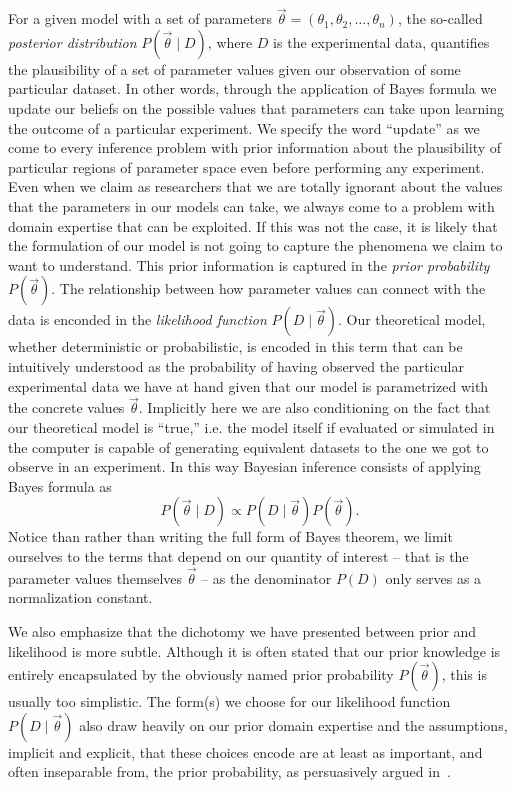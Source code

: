 For a given model with a set of parameters $\vec{\theta} = (\theta_1, \theta_2,
\ldots, \theta_n)$, the so-called \textit{posterior distribution} 
$P(\vec{\theta} \mid D)$, where $D$ is the experimental data, quantifies the
plausibility of a set of parameter values given our observation of some
particular dataset. In other words, through the application of Bayes formula we
update our beliefs on the possible values that parameters can take upon learning
the outcome of a particular experiment. We specify the word ``update'' as we
come to every inference problem with prior information about the plausibility of
particular regions of parameter space even before performing any experiment.
Even when we claim as researchers that we are totally ignorant about the values
that the parameters in our models can take, we always come to a problem with
domain expertise that can be exploited. If this was not the case, it is likely
that the formulation of our model is not going to capture the phenomena we claim
to want to understand. This prior information is captured in the \textit{prior
probability} $P(\vec{\theta})$. The relationship between how parameter values
can connect with the data is enconded in the \textit{likelihood function} $P(D
\mid \vec{\theta})$. Our theoretical model, whether deterministic or
probabilistic, is encoded in this term that can be intuitively understood as the
probability of having observed the particular experimental data we have at hand
given that our model is parametrized with the concrete values $\vec{\theta}$. 
Implicitly here we are also conditioning on the fact that our theoretical model
is ``true,'' i.e. the model itself if evaluated or simulated in the computer is
capable of generating equivalent datasets to the one we got to observe in an 
experiment. In this way Bayesian inference consists of applying Bayes formula 
as 
\begin{equation}
P(\vec{\theta} \mid D) \propto P(D \mid \vec{\theta}) P(\vec{\theta}).
\end{equation}
Notice than rather than writing the full form of Bayes theorem, we limit 
ourselves to the terms that depend on our quantity of interest -- that is the 
parameter values themselves $\vec{\theta}$ -- as the denominator $P(D)$ only
serves as a normalization constant.

We also emphasize that the dichotomy we have presented between prior and
likelihood is more subtle. Although it is often stated that our prior
knowledge is entirely encapsulated by the obviously named prior
probability $P(\vec{\theta})$, this is usually too simplistic.
The form(s) we choose for our likelihood function
$P(D \mid \vec{\theta})$ also draw heavily on our prior domain expertise
and the assumptions, implicit and explicit, that these choices encode are
at least as important, and often inseparable from,
the prior probability, as persuasively argued in~\cite{Gelman2017}.

